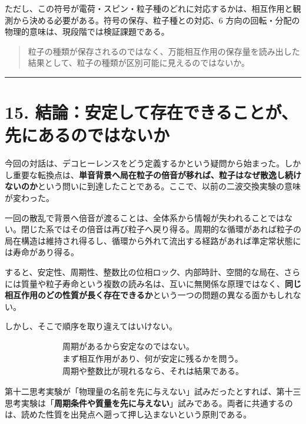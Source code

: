 \documentclass[
  a4paper,
]{ltjsarticle}
\begin{document}
ただし、この符号が電荷・スピン・粒子種のどれに対応するかは、相互作用と観測から決める必要がある。符号の保存、粒子種との対応、6
方向の回転・分配の物理的意味は、現段階では検証課題である。

\begin{quote}
粒子の種類が保存されるのではなく、万能相互作用の保存量を読み出した結果として、粒子の種類が区別可能に見えるのではないか。
\end{quote}

\begin{center}\rule{0.5\linewidth}{0.5pt}\end{center}

\section{15.
結論：安定して存在できることが、先にあるのではないか}\label{ux7d50ux8ad6ux5b89ux5b9aux3057ux3066ux5b58ux5728ux3067ux304dux308bux3053ux3068ux304cux5148ux306bux3042ux308bux306eux3067ux306fux306aux3044ux304b}

今回の対話は、デコヒーレンスをどう定義するかという疑問から始まった。しかし重要な転換点は、\textbf{単音背景へ局在粒子の倍音が移れば、粒子はなぜ散逸し続けないのか}という問いに到達したことである。ここで、以前の二波交換実験の意味が変わった。

一回の散乱で背景へ倍音が渡ることは、全体系から情報が失われることではない。閉じた系ではその倍音は再び粒子へ戻り得る。周期的な循環があれば粒子の局在構造は維持され得るし、循環から外れて流出する経路があれば準定常状態には寿命があり得る。

すると、安定性、周期性、整数比の位相ロック、内部時計、空間的な局在、さらには質量や粒子寿命という複数の読み名は、互いに無関係な原理ではなく、\textbf{同じ相互作用のどの性質が長く存在できるか}という一つの問題の異なる面かもしれない。

しかし、そこで順序を取り違えてはいけない。

\[
\boxed{\begin{array}{c}
\text{周期があるから安定なのではない。}
\\
\text{まず相互作用があり、何が安定に残るかを問う。}
\\
\text{周期や整数比が現れるなら、それは結果である。}
\end{array}}
\]

第十二思考実験が「物理量の名前を先に与えない」試みだったとすれば、第十三思考実験は「\textbf{周期条件や質量を先に与えない}」試みである。両者に共通するのは、読めた性質を出発点へ遡って押し込まないという原則である。
\end{document}
